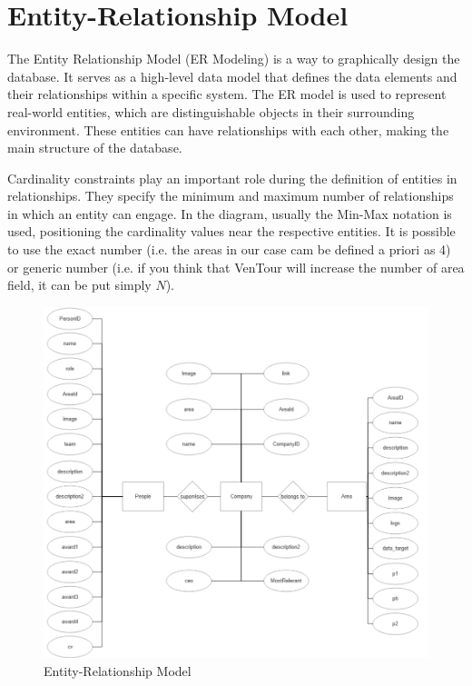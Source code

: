 \documentclass[../../DD.tex]{subfiles}
\begin{document}
\section{Entity-Relationship Model}

	The Entity Relationship Model (ER Modeling) is a way to graphically design the database. It serves as a high-level data model that defines the data elements and their relationships within a specific system. The ER model is used to represent real-world entities, which are distinguishable objects in their surrounding environment. These entities can have relationships with each other, making the main structure of the database.
    
    Cardinality constraints play an important role during the definition of entities in relationships. They specify the minimum and maximum number of relationships in which an entity can engage. In the diagram, usually the Min-Max notation is used, positioning the cardinality values near the respective entities. It is possible to use the exact number (i.e. the areas in our case cam be defined a priori as 4) or generic number (i.e. if you think that VenTour will increase the number of area field, it can be put simply $N$).
    \begin{figure}[h]
        \centering
        \includegraphics[width=\textwidth]{Images/Database/ERD.png}
        \caption{Entity-Relationship Model}
        \label{fig: ERD}
    \end{figure}
\end{document}
